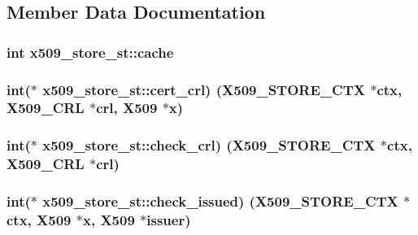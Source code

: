 \subsection{Member Data Documentation}
\subsubsection[{\texorpdfstring{cache}{cache}}]{\setlength{\rightskip}{0pt plus 5cm}int x509\+\_\+store\+\_\+st\+::cache}\hypertarget{structx509__store__st_a39100a4cc433d10485ffe0c30c5b88f8}{}\label{structx509__store__st_a39100a4cc433d10485ffe0c30c5b88f8}
\subsubsection[{\texorpdfstring{cert\+\_\+crl}{cert_crl}}]{\setlength{\rightskip}{0pt plus 5cm}int($\ast$ x509\+\_\+store\+\_\+st\+::cert\+\_\+crl) ({\bf X509\+\_\+\+S\+T\+O\+R\+E\+\_\+\+C\+TX} $\ast$ctx, {\bf X509\+\_\+\+C\+RL} $\ast$crl, {\bf X509} $\ast$x)}\hypertarget{structx509__store__st_a9e4cbd526c96a9d6eca4b05026e3848f}{}\label{structx509__store__st_a9e4cbd526c96a9d6eca4b05026e3848f}
\subsubsection[{\texorpdfstring{check\+\_\+crl}{check_crl}}]{\setlength{\rightskip}{0pt plus 5cm}int($\ast$ x509\+\_\+store\+\_\+st\+::check\+\_\+crl) ({\bf X509\+\_\+\+S\+T\+O\+R\+E\+\_\+\+C\+TX} $\ast$ctx, {\bf X509\+\_\+\+C\+RL} $\ast$crl)}\hypertarget{structx509__store__st_a7aac41f5042c0d73d994d554dc80bab4}{}\label{structx509__store__st_a7aac41f5042c0d73d994d554dc80bab4}
\subsubsection[{\texorpdfstring{check\+\_\+issued}{check_issued}}]{\setlength{\rightskip}{0pt plus 5cm}int($\ast$ x509\+\_\+store\+\_\+st\+::check\+\_\+issued) ({\bf X509\+\_\+\+S\+T\+O\+R\+E\+\_\+\+C\+TX} $\ast$ctx, {\bf X509} $\ast$x, {\bf X509} $\ast$issuer)}\hypertarget{structx509__store__st_a28e3031f30d155bfcee3077781875dd5}{}\label{structx509__store__st_a28e3031f30d155bfcee3077781875dd5}
